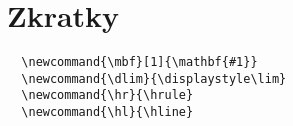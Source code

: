 \documentclass[main.tex]{subfiles}
\begin{document}
\section*{Zkratky}
\begin{verbatim}
  \newcommand{\mbf}[1]{\mathbf{#1}}
  \newcommand{\dlim}{\displaystyle\lim}
  \newcommand{\hr}{\hrule}
  \newcommand{\hl}{\hline}
\end{verbatim}
\end{document}
